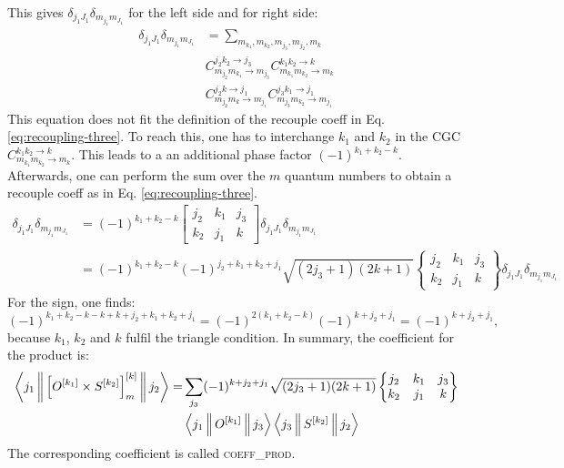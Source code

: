 \documentclass[a4paper,10pt,parskip=full]{scrartcl}
\begin{document}
This gives $\delta_{j_1J_1}\delta_{m_{j_1}m_{J_1}}$ for the left side and for right side:
\begin{equation}
  \begin{split}
    \delta_{j_1J_1}\delta_{m_{j_1}m_{J_1}}  &=
    \sum_{m_{k_1},m_{k_2},m_{j_3},m_{j_2},m_k}\\
    &C^{j_2k_2\rightarrow j_3}_{m_{j_2}m_{k_1}\rightarrow m_{j_3}}
    C^{k_1k_2\rightarrow k}_{m_{k_1}m_{k_2}\rightarrow m_{k}}\\
    &C^{j_2k\rightarrow j_1}_{m_{j_2}m_k\rightarrow m_{j_1}}
    C^{j_3k_1\rightarrow j_1}_{m_{j_3}m_{k_2}\rightarrow m_{j_1}}
  \end{split}
\end{equation}
This equation does not fit the definition of the recouple coeff in Eq. \eqref{eq:recoupling-three}.
To reach this, one has to interchange $k_1$ and $k_2$ in the CGC $C^{k_1k_2\rightarrow k}_{m_{k_1}m_{k_2}\rightarrow m_{k}}$.
This leads to a an additional phase factor $(-1)^{k_1+k_2-k}$.
Afterwards, one can perform the sum over the $m$ quantum numbers to obtain a recouple coeff as in Eq. \eqref{eq:recoupling-three}.
\begin{equation}
  \begin{split}
  \delta_{j_1J_1}\delta_{m_{j_1}m_{J_1}}  &=
  (-1)^{k_1+k_2-k}
  \begin{bmatrix}
    j_2 & k_1 & j_{3} \\
    k_2 & j_1 & k
  \end{bmatrix}\delta_{j_1J_1}\delta_{m_{j_1}m_{J_1}}\\
  &=
  (-1)^{k_1+k_2-k}(-1)^{j_2+k_1+k_2+j_1}\sqrt{(2j_3+1)(2k+1)}
  \begin{Bmatrix}
    j_2 & k_1 & j_{3} \\
    k_2 & j_1 & k
  \end{Bmatrix}\delta_{j_1J_1}\delta_{m_{j_1}m_{J_1}}
  \end{split}
\end{equation}
For the sign, one finds:
\begin{equation}
  (-1)^{k_1+k_2-k-k+k+j_2+k_1+k_2+j_1}=(-1)^{2(k_1+k_2-k)}(-1)^{k+j_2+j_1}=(-1)^{k+j_2+j_1},
\end{equation}
because $k_1$, $k_2$ and $k$ fulfil the triangle condition.
In summary, the coefficient for the product is:
\begin{equation}
  \label{eq:coeff_prod}
  \begin{split}
  \Braket{j_1 ||\left[O^{[k_1]}\times S^{[k_2]}\right]^{[k]}_m||j_2} =& \sum_{j_3}(-1)^{k+j_2+j_1}\sqrt{(2j_3+1)(2k+1)}
  \begin{Bmatrix}
    j_2 & k_1 & j_{3} \\
    k_2 & j_1 & k
  \end{Bmatrix}\\
  &\Braket{j_1||O^{[k_1]}||j_3}\Braket{j_3||S^{[k_2]}||j_2}
  \end{split}
\end{equation}
The corresponding coefficient is called \textsc{coeff\_prod}.
\end{document}
